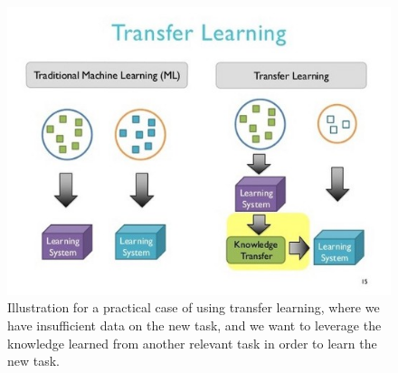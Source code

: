 \begin{figure}[!htbp]
  \centering
  \includegraphics[scale=0.8]{./images/introduction/transfer_learning_illustration.jpeg}
  \caption{Illustration for a practical case of using transfer learning, where we have insufficient data on the new task, and we want to leverage the knowledge learned from another relevant task in order to learn the new task.}
  \label{fig:illustrate_TL}
\end{figure}


